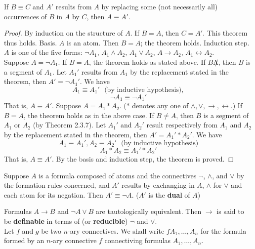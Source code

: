 \documentclass[english, 11pt]{article}
\begin{document}
  \begin{thrm}[replaceability]
    If $B \equiv C$ and $A'$ results from $A$ by replacing some (not necessarily all) occurrences of $B$ in $A$ by $C$, then $A \equiv A'$.
  \end{thrm}

  \begin{proof}
    By induction on the structure of $A$.
If $B = A$, then $C = A'$. This theorem thus holds.
Basis. $A$ is an atom. Then $B = A$; the theorem holds.
Induction step. $A$ is one of the five forms: $\neg A_1$, $A_1 \land A_2$, $A_1 \lor A_2$, $A \rightarrow A_2$, $A_1 \leftrightarrow A_2$. \\
Suppose $A = \neg A_1$. If $B = A$, the theorem holds as stated above. If $B \not A$, then $B$ is a segment of $A_1$. Let $A_1'$ results from $A_1$ by the replacement stated in the theorem, then $A' = \neg A_1'$. We have
\[ A_1 \equiv A_1' \ \ \ \mbox{(by inductive hypothesis)}, \]
\[ \neg A_1 \equiv \neg A_1' \]
That is, $A \equiv A'$.
Suppose $A = A_1 * A_2$. ($*$ denotes any one of $\land, \lor, \rightarrow, \leftrightarrow$.) If $B = A$, the theorem holds as in the above case. If $B \not = A$, then $B$ is a segment of $A_1$ or $A_2$ (by Theorem 2.3.7). Let $A_1'$ and $A_2'$ result respectively from $A_1$ and $A_2$ by the replacement stated in the theorem, then $A' = A_1' * A_2'$. We have
\[ A_1 \equiv A_1', A_2 \equiv A_2' \ \ \ \mbox{(by inductive hypothesis)} \]
\[ A_1 * A_2 \equiv A_1' * A_2' \]
That is, $A \equiv A'$. By the basis and induction step, the theorem is proved.
  \end{proof}

  \begin{thrm}[duality]
    Suppose $A$ is a formula composed of atoms and the connectives $\neg$, $\land$, and $\lor$ by the formation rules concerned, and $A'$ results by exchanging in $A$, $\land$ for $\lor$ and each atom for its negation. Then $A' \equiv \neg A$. ($A'$ is the \textbf{dual} of $A$)
  \end{thrm}

  Formulas $A \rightarrow B$ and $\neg A \lor B$ are tautologically equivalent. Then $\rightarrow$ is said to be \textbf{definable} in terms of (or \textbf{reducible}) $\neg$ and $\lor$. \\

  Let $f$ and $g$ be two $n$-ary connectives. We shall write $fA_1, \ldots, A_n$ for the formula formed by an $n$-ary connective $f$ connectiving formulas $A_1, \ldots, A_n$.
\end{document}
